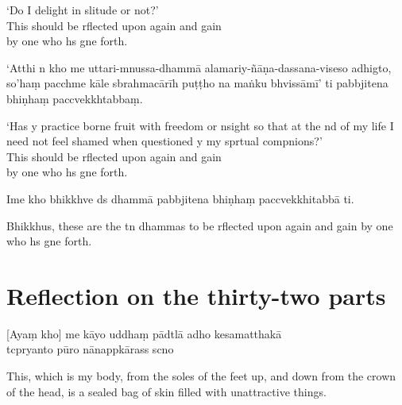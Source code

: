\begin{english}
`Do I delight in slitude or not?'\\
This should be rflected upon again and gain\\
by one who hs gne forth.
\end{english}

`Atthi n kho me uttari-mnussa-dhammā
alamariy-ñāṇa-dassana-viseso adhigto, so'haṃ pacchme
kāle sbrahmacārīh puṭṭho na maṅku bhvissāmī' ti
pabbjitena bhiṇhaṃ paccvekkhtabbaṃ.

\begin{english}
`Has y practice borne fruit with freedom or nsight so that at the nd of my life I need not feel shamed when questioned y my sprtual compnions?'\\
This should be rflected upon again and gain\\
by one who hs gne forth.
\end{english}

Ime kho bhikkhve ds dhammā pabbjitena
bhiṇhaṃ paccvekkhitabbā ti.

\begin{english}
Bhikkhus, these are the tn dhammas to be rflected upon again
and gain by one who hs gne forth.
\end{english}

\chapter[Thirty-two parts]{Reflection on the thirty-two parts}

\begin{leader}
\end{leader}

[Ayaṃ kho] me kāyo uddhaṃ pādtlā adho kesamatthakā\\
tcpryanto pūro nānappkārass scno

\begin{english}
  This, which is my body, from the soles of the feet up, and down from the crown of the head, is a sealed bag of skin filled with unattractive things.
\end{english}

